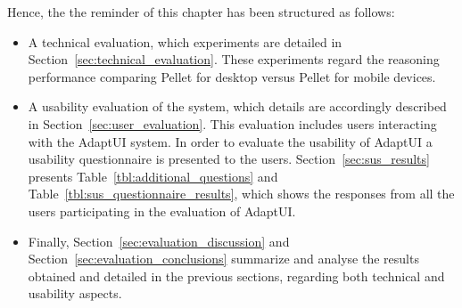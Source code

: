 Hence, the the reminder of this chapter has been structured as follows: 

\begin{itemize}
  \item A technical evaluation, which experiments are detailed in 
  Section~\ref{sec:technical_evaluation}. These experiments regard the 
  reasoning performance comparing Pellet for desktop versus Pellet for mobile 
  devices. 
  
  \item A usability evaluation of the system, which details are accordingly 
  described in Section~\ref{sec:user_evaluation}. This evaluation includes 
  users interacting with the AdaptUI system. In order to evaluate the usability 
  of AdaptUI a usability questionnaire is presented to the users. 
  Section~\ref{sec:sus_results} presents Table~\ref{tbl:additional_questions} and
  Table~\ref{tbl:sus_questionnaire_results}, which shows the responses from all
  the users participating in the evaluation of AdaptUI.

  \item Finally, Section~\ref{sec:evaluation_discussion} and 
  Section~\ref{sec:evaluation_conclusions} summarize and analyse the results
  obtained and detailed in the previous sections, regarding both technical and
  usability aspects.
\end{itemize}




%

% 

